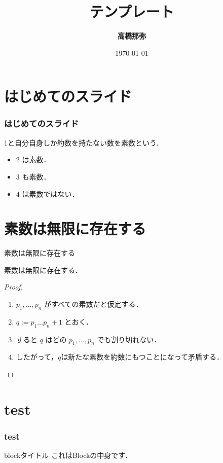 \documentclass[dvipdfmx, 11pt]{beamer}
\title{テンプレート}
\author{\textbf{高橋那弥}}
\institute{文殊の知恵}
\date{\today}
\theoremstyle{definition}
\begin{document}
\maketitle
\frame{\tableofcontents[hideallsubsections]}
\section{はじめてのスライド}
\begin{frame}
  \frametitle{はじめてのスライド}
  \begin{definition}
    1と自分自身しか約数を持たない数を\alert{素数}という．
  \end{definition}
  \begin{example}
    \begin{itemize}
      \item 2 は素数．
      \pause
      \item 3 も素数．
      \pause
      \item 4 は素数ではない．
    \end{itemize}
  \end{example}
\end{frame}
\section{素数は無限に存在する}
\begin{frame}{素数は無限に存在する}
  \begin{theorem}
  素数は無限に存在する．
  \end{theorem}
  \begin{proof}
    \begin{enumerate}
      \item<1-> $p_1, \dots, p_n$ がすべての素数だと仮定する．
      \item<2-> $q:=p_1\dots p_n + 1$ とおく．
      \item<3-> すると $q$ はどの $p_1,\dots,p_n$ でも割り切れない．
      \item<1-> したがって，$q$は新たな素数を約数にもつことになって矛盾する．\qedhere
    \end{enumerate}
  \end{proof}
\end{frame}
\section{test}
\begin{frame}
  \frametitle{test}
  \begin{block}{blockタイトル}
    これはBlockの中身です．
  \end{block}
\end{frame}
\end{document}
